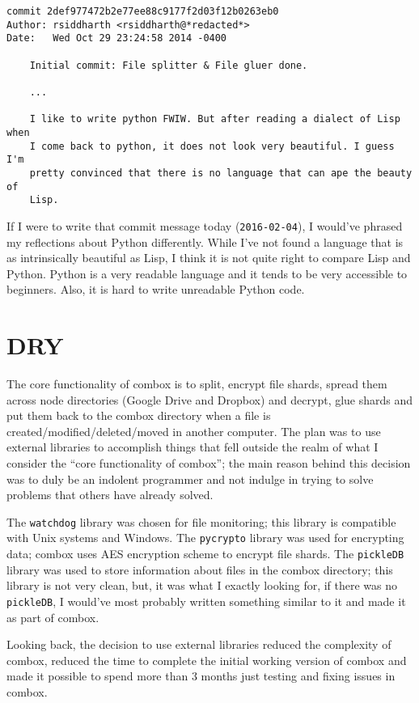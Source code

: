 \begin{verbatim}
commit 2def977472b2e77ee88c9177f2d03f12b0263eb0
Author: rsiddharth <rsiddharth@*redacted*>
Date:   Wed Oct 29 23:24:58 2014 -0400

    Initial commit: File splitter & File gluer done.

    ...

    I like to write python FWIW. But after reading a dialect of Lisp when
    I come back to python, it does not look very beautiful. I guess I'm
    pretty convinced that there is no language that can ape the beauty of
    Lisp.
\end{verbatim}

If I were to write that commit message today (\verb+2016-02-04+), I
would've phrased my reflections about Python differently. While I've
not found a language that is as intrinsically beautiful as Lisp, I
think it is not quite right to compare Lisp and Python. Python is a
very readable language and it tends to be very accessible to
beginners. Also, it is hard to write unreadable Python code.

\section{DRY}

The core functionality of combox is to split, encrypt file shards,
spread them across node directories (Google Drive and Dropbox) and
decrypt, glue shards and put them back to the combox directory when a
file is created/modified/deleted/moved in another computer. The plan
was to use external libraries to accomplish things that fell outside
the realm of what I consider the ``core functionality of combox''; the
main reason behind this decision was to duly be an indolent programmer
and not indulge in trying to solve problems that others have already
solved.

The \verb+watchdog+\cite{pylib:watchdog} library was chosen for file
monitoring; this library is compatible with Unix systems and
Windows. The \verb+pycrypto+ library\cite{pylib:pycrypto} was used for
encrypting data; combox uses AES encryption scheme to encrypt file
shards. The \verb+pickleDB+\cite{pylib:pickledb} library was used to
store information about files in the combox directory; this library is
not very clean, but, it was what I exactly looking for, if there was
no \verb+pickleDB+, I would've most probably written something similar
to it and made it as part of combox.

Looking back, the decision to use external libraries reduced the
complexity of combox, reduced the time to complete the initial working
version of combox and made it possible to spend more than 3 months
just testing and fixing issues in combox.

